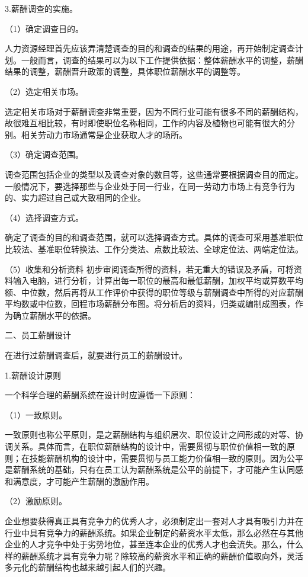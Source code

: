     3.薪酬调查的实施。

    （1）确定调查目的。

    人力资源经理首先应该弄清楚调查的目的和调查的结果的用途，再开始制定调查计划。一般而言，调查的结果可以为以下工作提供依据：整体薪酬水平的调整，薪酬结果的调整，薪酬晋升政策的调整，具体职位薪酬水平的调整等。

    （2）选定相关市场。

    选定相关市场对于薪酬调查非常重要，因为不同行业可能有很多不同的薪酬结构，故很难互相比较，有时即使职位名称相同，工作的内容及植物也可能有很大的分别。相关劳动力市场通常是企业获取人才的场所。

    （3）确定调查范围。

    调查范围包括企业的类型以及调查对象的数目等，这些通常要根据调查目的而定。一般情况下，要选择那些与企业处于同一行业，在同一劳动力市场上有竞争行为的、实力超过自己或大致相同的企业。

    （4）选择调查方式。

    确定了调查的目的和调查范围，就可以选择调查方式。具体的调查可采用基准职位比较法、基准职位转换法、工作分类法、点数比较法、全球定位法、两端定位法。

    （5）收集和分析资料
    初步审阅调查所得的资料，若无重大的错误及矛盾，可将资料输入电脑，进行分析，计算出每一职位的最高和最低薪酬，加权平均或算数平均额、中位数，然后再将从工作评价中获得的职位等级与薪酬调查中所得的对应薪酬平均数或中位数，回程市场薪酬分布图。将分析后的资料，归类或编制成图表，作为确立薪酬水平的依据。

    二、员工薪酬设计

    在进行过薪酬调查后，就要进行员工的薪酬设计。

    1.薪酬设计原则

    一个科学合理的薪酬系统在设计时应遵循一下原则：

    （1）一致原则。

    一致原则也称公平原则，是之薪酬结构与组织层次、职位设计之间形成的对等、协调关系。具体而言，在职位薪酬结构的设计中，需要贯彻与职位价值相一致的原则；在技能薪酬机构的设计中，需要贯彻与员工能力价值相一致的原则。因为公平是薪酬系统的基础，只有在员工认为薪酬系统是公平的前提下，才可能产生认同感和满意度，才可能产生薪酬的激励作用。

    （2）激励原则。

    企业想要获得真正具有竞争力的优秀人才，必须制定出一套对人才具有吸引力并在行业中具有竞争力的薪酬系统。如果企业制定的薪资水平太低，那么必然在与其他企业的人才竞争中处于劣势地位，甚至连本企业的优秀人才也会流失。那么，什么样的薪酬系统才具有竞争力呢？除较高的薪资水平和正确的薪酬价值取向外，灵活多元化的薪酬结构也越来越引起人们的兴趣。


